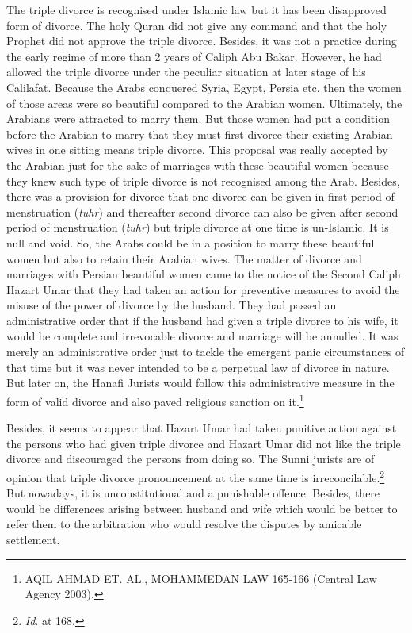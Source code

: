 \begin{multicols}{2}
\noi
The triple divorce is recognised under Islamic law but it has been disapproved form of
divorce. The holy Quran did not give any command and that the holy Prophet did not approve
the triple divorce. Besides, it was not a practice during the early regime of more than 2 years
of Caliph Abu Bakar. However, he had allowed the triple divorce under the peculiar situation
at later stage of his Calilafat. Because the Arabs conquered Syria, Egypt, Persia etc. then the
women of those areas were so beautiful compared to the Arabian women. Ultimately, the
Arabians were attracted to marry them. But those women had put a condition before the
Arabian to marry that they must first divorce their existing Arabian wives in one sitting
means triple divorce. This proposal was really accepted by the Arabian just for the sake of
marriages with these beautiful women because they knew such type of triple divorce is not
recognised among the Arab. Besides, there was a provision for divorce that one divorce can
be given in first period of menstruation ({\it tuhr}) and thereafter second divorce can also be given
after second period of menstruation ({\it tuhr}) but triple divorce at one time is un-Islamic. It is
null and void. So, the Arabs could be in a position to marry these beautiful women but also to
retain their Arabian wives. The matter of divorce and marriages with Persian beautiful
women came to the notice of the Second Caliph Hazart Umar that they had taken an action
for preventive measures to avoid the misuse of the power of divorce by the husband. They
had passed an administrative order that if the husband had given a triple divorce to his wife, it
would be complete and irrevocable divorce and marriage will be annulled. It was merely an
administrative order just to tackle the emergent panic circumstances of that time but it was
never intended to be a perpetual law of divorce in nature. But later on, the Hanafi Jurists
would follow this administrative measure in the form of valid divorce and also paved
religious sanction on it.\footnote{ AQIL AHMAD ET. AL., MOHAMMEDAN LAW 165-166 (Central Law Agency 2003).} 

\noi
Besides, it seems to appear that Hazart Umar had taken punitive action against the persons
who had given triple divorce and Hazart Umar did not like the triple divorce and discouraged
the persons from doing so. The Sunni jurists are of opinion that triple divorce pronouncement
at the same time is irreconcilable.\footnote{{\it Id}. at 168.} But nowadays, it is unconstitutional and a punishable
offence. Besides, there would be differences arising between husband and wife which would
be better to refer them to the arbitration who would resolve the disputes by amicable
settlement.


\end{multicols}
